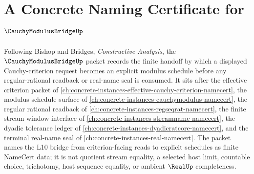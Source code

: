 \chapter{A Concrete Naming Certificate for $\CauchyModulusBridgeUp$}
\label{ch:concrete-instances-cauchy-modulus-bridge-namecert}

Following Bishop and Bridges, \emph{Constructive Analysis}, the $\CauchyModulusBridgeUp$ packet records the finite handoff by which a displayed Cauchy-criterion request becomes an explicit modulus schedule before any regular-rational readback or real-name seal is consumed. It sits after the effective criterion packet of \autoref{ch:concrete-instances-effective-cauchy-criterion-namecert}, the modulus schedule surface of \autoref{ch:concrete-instances-cauchymodulus-namecert}, the regular rational readback of \autoref{ch:concrete-instances-regseqrat-namecert}, the finite stream-window interface of \autoref{ch:concrete-instances-streamname-namecert}, the dyadic tolerance ledger of \autoref{ch:concrete-instances-dyadicratcore-namecert}, and the terminal real-name seal of \autoref{ch:concrete-instances-real-namecert}. The packet names the L10 bridge from criterion-facing reads to explicit schedules as finite NameCert data; it is not quotient stream equality, a selected host limit, countable choice, trichotomy, host sequence equality, or ambient $\RealUp$ completeness.

